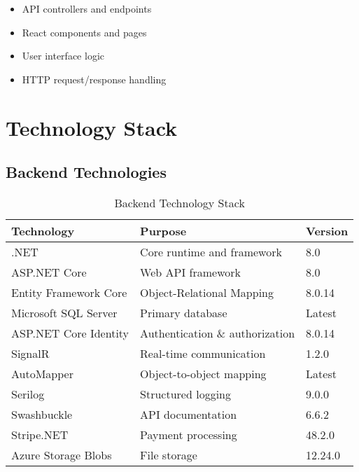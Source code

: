 \documentclass[12pt,a4paper]{article}
\begin{document}
\begin{tcolorbox}[colback=lightgray, colframe=dangerred, title=Presentation Layer]
    \begin{itemize}
        \item API controllers and endpoints
        \item React components and pages
        \item User interface logic
        \item HTTP request/response handling
    \end{itemize}
\end{tcolorbox}

\section{Technology Stack}

\subsection{Backend Technologies}

\begin{table}[H]
    \centering
    \begin{tabularx}{\textwidth}{|l|X|l|}
        \hline
        \textbf{Technology} & \textbf{Purpose} & \textbf{Version} \\
        \hline
        .NET & Core runtime and framework & 8.0 \\
        \hline
        ASP.NET Core & Web API framework & 8.0 \\
        \hline
        Entity Framework Core & Object-Relational Mapping & 8.0.14 \\
        \hline
        Microsoft SQL Server & Primary database & Latest \\
        \hline
        ASP.NET Core Identity & Authentication \& authorization & 8.0.14 \\
        \hline
        SignalR & Real-time communication & 1.2.0 \\
        \hline
        AutoMapper & Object-to-object mapping & Latest \\
        \hline
        Serilog & Structured logging & 9.0.0 \\
        \hline
        Swashbuckle & API documentation & 6.6.2 \\
        \hline
        Stripe.NET & Payment processing & 48.2.0 \\
        \hline
        Azure Storage Blobs & File storage & 12.24.0 \\
        \hline
    \end{tabularx}
    \caption{Backend Technology Stack}
\end{table}
\end{document}
